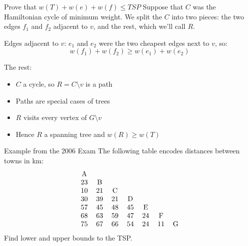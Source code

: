 \documentclass{beamer}
\begin{document}
\begin{frame}{Prove that $w(T)+w(e)+w(f)\leq TSP$}
  Suppose that $C$ was the Hamiltonian cycle of minimum weight.  We split the $C$ into two pieces: the two edges $f_1$ and $f_2$ adjacent to $v$, and the rest, which we'll call $R$.

 \begin{block}{Edges adjacent to $v$:}
   $e_1$ and $e_2$ were the two cheapest edges next to $v$, so:
   $$w(f_1)+w(f_2)\geq w(e_1)+w(e_2)$$
 \end{block}

 \begin{block}{The rest:}
\begin{itemize}
\item $C$ a cycle, so $R=C\setminus v$ is a path
\item Paths are special cases of trees
\item $R$ visits every vertex of $G\setminus v$
\item Hence $R$ a spanning tree and $w(R)\geq w(T)$
  \end{itemize}
 \end{block}
 \end{frame}
\begin{frame}{Example from the 2006 Exam}
  The following table encodes distances between towns in km:
$$
  \begin{tabular}{ccccccc}
    A   &   &   &   &   &   & \\
    23  & B &   &   &   &   & \\
    10  & 21& C &   &   &   & \\
    30  & 39& 21& D &   &   & \\
    57  & 45& 48& 45& E &   & \\
    68  & 63& 59& 47& 24& F & \\
    75  & 67& 66& 54& 24& 11& G
    \end{tabular}
  $$
  Find lower and upper bounds to the TSP.

  
\end{frame}
  
\end{document}
